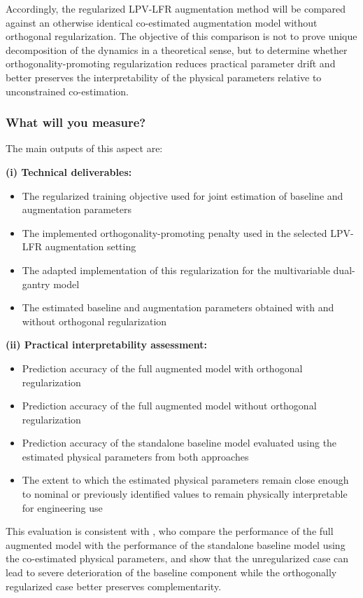 Accordingly, the regularized LPV-LFR augmentation method will be compared against an otherwise identical co-estimated augmentation model without orthogonal regularization. The objective of this comparison is not to prove unique decomposition of the dynamics in a theoretical sense, but to determine whether orthogonality-promoting regularization reduces practical parameter drift and better preserves the interpretability of the physical parameters relative to unconstrained co-estimation.

\subsubsection{What will you measure?}

The main outputs of this aspect are:

\textbf{(i) Technical deliverables:}
\begin{itemize}
    \item The regularized training objective used for joint estimation of baseline and augmentation parameters
    \item The implemented orthogonality-promoting penalty used in the selected LPV-LFR augmentation setting
    \item The adapted implementation of this regularization for the multivariable dual-gantry model
    \item The estimated baseline and augmentation parameters obtained with and without orthogonal regularization
\end{itemize}

\textbf{(ii) Practical interpretability assessment:}
\begin{itemize}
    \item Prediction accuracy of the full augmented model with orthogonal regularization
    \item Prediction accuracy of the full augmented model without orthogonal regularization
    \item Prediction accuracy of the standalone baseline model evaluated using the estimated physical parameters from both approaches
    \item The extent to which the estimated physical parameters remain close enough to nominal or previously identified values to remain physically interpretable for engineering use
\end{itemize}

This evaluation is consistent with \citet{gyorok2025orthogonal}, who compare the performance of the full augmented model with the performance of the standalone baseline model using the co-estimated physical parameters, and show that the unregularized case can lead to severe deterioration of the baseline component while the orthogonally regularized case better preserves complementarity.

